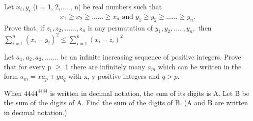 \item Let $x_i, y_i$ (i = 1, 2,....., n) be real numbers such that
\begin{align*}
x_1 \geq x_2 \geq...... \geq x_n  \text{ and } y_1 \geq y_2 \geq...... \geq y_n.
\end{align*}
Prove that, if $z_1, z_2,...... , z_n$ is any permutation of $y_1, y_2,..... , y_n,$ then\\
$\sum_{i=1}^{n}(x_i - y_i)^2 \leq \sum_{i=1}^{n}(x_i - z_i)^2$
\item Let $a_1, a_2, a_3,.......$ be an infinite increasing sequence of positive integers. Prove that for every p $\geq$ 1 there are infinitely many $a_m$ which can be written in the form $a_m = xa_p + ya_q$ with x, y positive integers and $q > p.$
\item When $4444^{4444}$ is written in decimal notation, the sum of its digits is A. Let
B be the sum of the digits of A. Find the sum of the digits of B. (A and B are written in decimal notation.)


